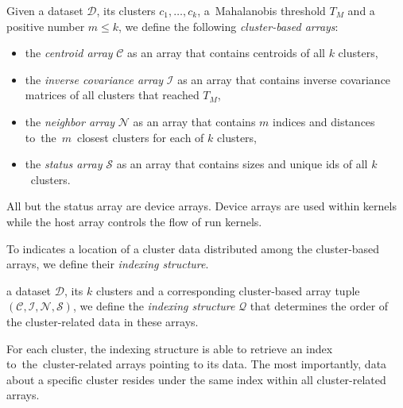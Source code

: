 \begin{defn}
	Given a dataset $\mathcal{D}$, its clusters $c_1,\dots,c_k$, a~Mahalanobis threshold $T_M$ and a positive number $m \le k$, we define the following \emph{cluster-based arrays}:
	\begin{itemize}
		\item the \emph{centroid array} $\mathcal{C}$ as an array that contains centroids of all $k$ clusters,
		\item the \emph{inverse covariance array} $\mathcal{I}$ as an array that contains inverse covariance matrices of all clusters that reached $T_M$,
		\item the \emph{neighbor array} $\mathcal{N}$ as an array that contains $m$ indices and distances to~the~$m$~closest clusters for each of $k$ clusters,
		\item the \emph{status array} $\mathcal{S}$ as an array that contains sizes and unique ids of all $k$~clusters.
	\end{itemize}
	\label{def03:tuple}
\end{defn}


All but the status array are device arrays. Device arrays are used within kernels while the host array controls the flow of run kernels.  

To indicates a location of a cluster data distributed among the cluster-based arrays, we define their \emph{indexing structure}.

\begin{defn}
	 a dataset $\mathcal{D}$, its $k$ clusters and a corresponding cluster-based array tuple $(\mathcal{C},\mathcal{I},\mathcal{N},\mathcal{S})$, we define the \emph{indexing structure} $\mathcal{Q}$ that determines the order of the cluster-related data in these arrays.
	\label{def03:index}
\end{defn}

For each cluster, the indexing structure is able to retrieve an index to~the~clus\-ter-related arrays pointing to its data. The most importantly, data about a specific cluster resides under the same index within all cluster-related arrays.



